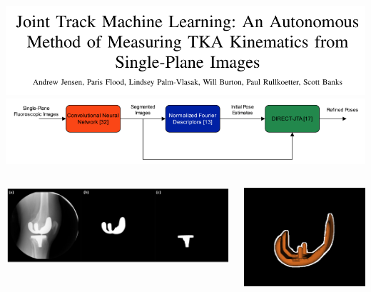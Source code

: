 \begin{frame}
   \centering
   \includegraphics[width=0.78\linewidth]{images/jtml-title.png}
   \vfill
   \includegraphics[width=0.75\linewidth]{images/jtml-pipeline.png}
   \vfill
   \begin{columns}
      \begin{column}{0.71\linewidth}
         \includegraphics[width=\columnwidth]{images/jtml-nn-image.png}
      \end{column}
      \begin{column}{0.29\linewidth}
         \includegraphics[width=\columnwidth]{images/jtml-registered-implant.png}
      \end{column}
   \end{columns}
\end{frame}

